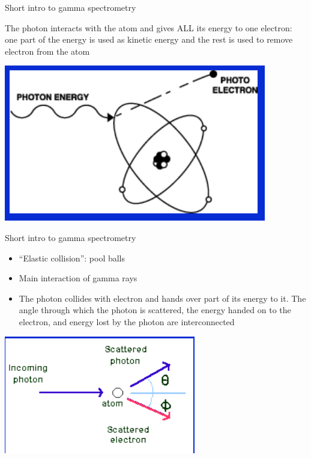 \begin{frame}{Short intro to gamma spectrometry}

{}

\vskip0.3cm
\alert{The photon interacts with the atom and gives ALL its energy to one electron: one part of the energy is used as kinetic energy and the rest is used to remove electron from the atom}

\vskip0.5cm
\centering
\includegraphics[scale=0.5]{figures/photoelectriceffect.png}

\end{frame}

\begin{frame}{Short intro to gamma spectrometry}

{}

\vskip0.3cm
\begin{exampleblock}{}

\begin{itemize}
\item ``Elastic collision'': pool balls 
\item Main interaction of gamma rays 
\item The photon collides with electron and hands over part of its energy to it. The angle through which the photon is scattered, the energy handed on to the electron, and energy lost by the photon are interconnected
\end{itemize}

\end{exampleblock}


\centering
\includegraphics[scale=0.4]{figures/comptoneffect.png}

\end{frame}


